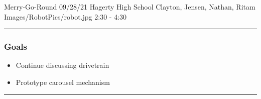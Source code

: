 \insertmeeting 
	{Merry-Go-Round} 
	{09/28/21}
	{Hagerty High School}
	{Clayton, Jensen, Nathan, Ritam}
	{Images/RobotPics/robot.jpg}
	{2:30 - 4:30}
	
\noindent\hfil\rule{\textwidth}{.4pt}\hfil
\subsubsection*{Goals}
\begin{itemize}
    \item Continue discussing drivetrain
    \item Prototype carousel mechanism
  

\end{itemize} 

\noindent\hfil\rule{\textwidth}{.4pt}\hfil

